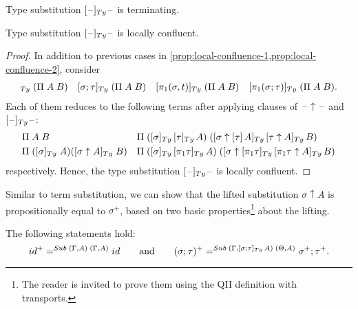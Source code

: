 \documentclass[a4paper,UKenglish,numberwithinsect,cleveref,thm-restate]{lipics-v2021}
\newcommand{\danger}{\marginpar[\hfill\dbend]{\dbend\hfill}}
\begin{document}
\begin{proposition}[Termination]
  Type substitution $[\blank]_{\Ty}\blank$ is terminating.
  \danger
\end{proposition}
\begin{proposition}\label{prop:local-confluence-3}
  Type substitution $[\blank]_{\Ty}\blank$ is locally confluent.
  \danger
\end{proposition}
\begin{proof}
  In addition to previous cases in \cref{prop:local-confluence-1,prop:local-confluence-2}, consider
  \begin{align*}
    [\idS]_{\Ty}\;(\Pi\;A\;B) && [\sigma;\tau]_{\Ty}\;(\Pi\;A\;B) && [\pi_1(\sigma, t)]_{\Ty}\;(\Pi\;A\;B) && [\pi_1(\sigma; \tau)]_{\Ty}\;(\Pi\;A\;B).
  \end{align*}
  Each of them reduces to the following terms after applying clauses of $\mathord{\hspace{1pt}\text{--}\hspace{1pt}}\uparrow\mathord{\hspace{1pt}\text{--}\hspace{1pt}}$ and $[\blank]_{\Ty}\blank$:
  \begin{align*}
    & \Pi\;A\;B                && \Pi\;([\sigma]_{\Ty}\,[\tau]_{\Ty}\,A)\;([\sigma \uparrow [\tau]\,A ]_{\Ty}\,[\tau \uparrow A ]_{\Ty}\,B) \\
    & \Pi\;([\sigma]_{\Ty}\;A)([\sigma \uparrow A]_{\Ty}\;B) && \Pi\;([\sigma]_{\Ty}\,[\pi_1\tau]_{\Ty}\,A)\;([\sigma \uparrow [\pi_1\tau]_{\Ty}\,[\pi_1\tau \uparrow A]_{\Ty}\,B)
  \end{align*}
  respectively.
  Hence, the type substitution $[\blank]_{\Ty}\blank$ is locally confluent.
\end{proof}

Similar to term substitution, we can show that the lifted substitution $\sigma \uparrow A$ is propositionally equal to $\sigma^+$, based on two basic properties\footnote{%
  The reader is invited to prove them using the QII definition with transports.}
about the lifting.
\begin{lemma} \label{lem:lifting}
  The following statements hold:
  \[
    \idS^+ =^{\Sub\;(\Gamma, A)\;(\Gamma, A)} \idS
    \qquad\text{and}\qquad
    (\sigma; \tau)^+     =^{\Sub\;(\Gamma, [\sigma; \tau]_{\Ty}\,A)\;(\Theta, A)} \sigma^+ ; \tau^+.
  \]
\end{lemma}
\end{document}
